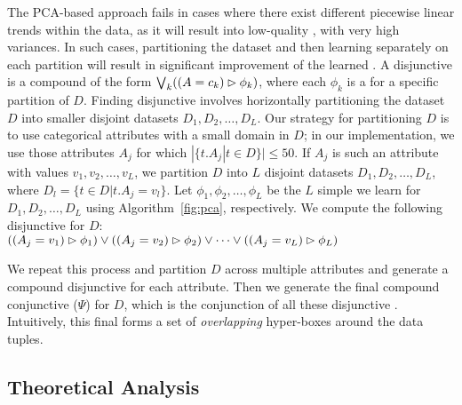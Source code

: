 The PCA-based approach fails in cases where there exist different piecewise linear
trends within the data, as it will result into low-quality \invariants, with
very high variances. In such cases, partitioning the dataset and then learning
\invariants separately on each partition will result in significant improvement
of the learned \invariants. A disjunctive \invariant is a compound \invariant
of the form $\bigvee_k((A = c_k) \rhd \phi_k)$, where each $\phi_k$ is a
\invariant for a specific partition of $D$. Finding disjunctive \invariants
involves horizontally partitioning the dataset $D$ into smaller disjoint
datasets $D_1, D_2, \ldots, D_L$. Our strategy for partitioning $D$ is to use
categorical attributes with a small domain in $D$; in our implementation, we
use those attributes $A_j$ for which $|\{t.A_j | t\in D\}|\le50$. If $A_j$ is
such an attribute with values $v_1, v_2, \ldots, v_L$, we partition $D$ into
$L$ disjoint datasets $D_1, D_2,\ldots, D_L$, where $D_l = \{t \in D | t.A_j =
v_l\}$. Let $\phi_1, \phi_2, \ldots, \phi_L$ be the $L$ simple \dis we learn
for $D_1, D_2, \ldots, D_L$ using Algorithm~\ref{fig:pca}, respectively. We
compute the following disjunctive \di for $D$:\\
%
\indent $
 ((A_j = v_1) \rhd \phi_1) \vee 
 ((A_j = v_2) \rhd \phi_2) \vee 
\cdots \vee
 ((A_j = v_L) \rhd \phi_L)\\[-0.7em]
$

 We repeat this process and partition $D$ across multiple
attributes and generate a compound disjunctive \invariant for each attribute.
Then we generate the final compound conjunctive \di ($\Psi$) for $D$, which is
the conjunction of all these disjunctive \invariants. Intuitively, this final
\di forms a set of \emph{overlapping} hyper-boxes around the data tuples.


\subsection{Theoretical Analysis}\label{sec:complexity} 


